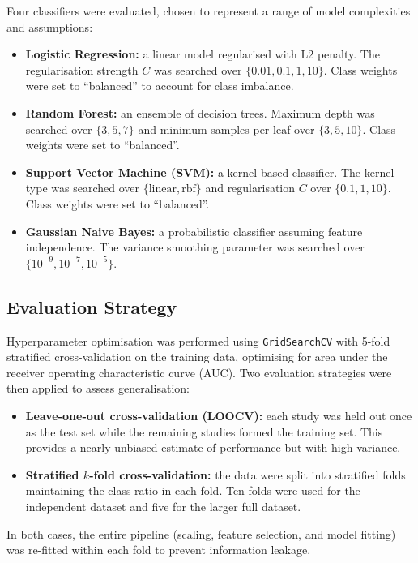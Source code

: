 Four classifiers were evaluated, chosen to represent a range of model complexities and assumptions:

\begin{itemize}
\item \textbf{Logistic Regression:} a linear model regularised with L2 penalty. The regularisation strength $C$ was searched over $\{0.01, 0.1, 1, 10\}$. Class weights were set to ``balanced'' to account for class imbalance.
\item \textbf{Random Forest:} an ensemble of decision trees. Maximum depth was searched over $\{3, 5, 7\}$ and minimum samples per leaf over $\{3, 5, 10\}$. Class weights were set to ``balanced''.
\item \textbf{Support Vector Machine (SVM):} a kernel-based classifier. The kernel type was searched over $\{\text{linear}, \text{rbf}\}$ and regularisation $C$ over $\{0.1, 1, 10\}$. Class weights were set to ``balanced''.
\item \textbf{Gaussian Naive Bayes:} a probabilistic classifier assuming feature independence. The variance smoothing parameter was searched over $\{10^{-9}, 10^{-7}, 10^{-5}\}$.
\end{itemize}

\subsection{Evaluation Strategy}

Hyperparameter optimisation was performed using \texttt{GridSearchCV} with 5-fold stratified cross-validation on the training data, optimising for area under the receiver operating characteristic curve (AUC). Two evaluation strategies were then applied to assess generalisation:

\begin{itemize}
\item \textbf{Leave-one-out cross-validation (LOOCV):} each study was held out once as the test set while the remaining studies formed the training set. This provides a nearly unbiased estimate of performance but with high variance.
\item \textbf{Stratified $k$-fold cross-validation:} the data were split into stratified folds maintaining the class ratio in each fold. Ten folds were used for the independent dataset and five for the larger full dataset.
\end{itemize}

In both cases, the entire pipeline (scaling, feature selection, and model fitting) was re-fitted within each fold to prevent information leakage.

